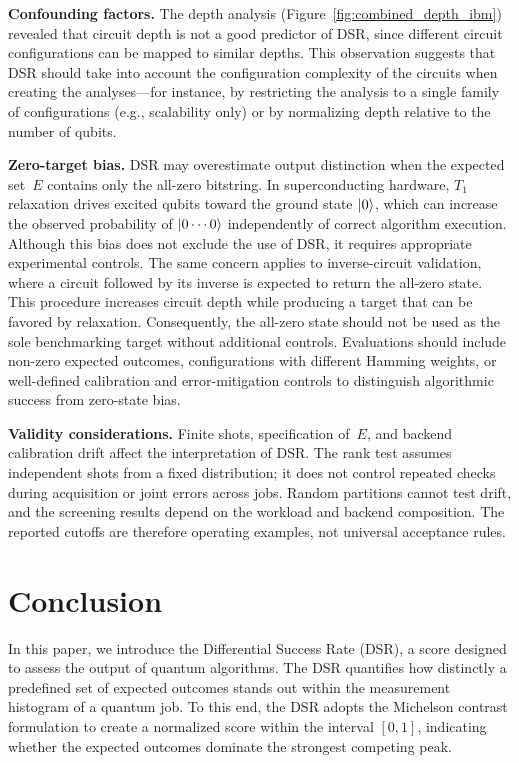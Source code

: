 \documentclass[pdflatex,sn-mathphys-num]{sn-jnl}
\theoremstyle{thmstyleone}%
\theoremstyle{thmstyletwo}%
\theoremstyle{thmstylethree}%
\begin{document}
\textbf{Confounding factors.} The depth analysis (Figure~\ref{fig:combined_depth_ibm}) revealed that circuit depth is not a good predictor of DSR, since different circuit configurations can be mapped to similar depths. This observation suggests that DSR should take into account the configuration complexity of the circuits when creating the analyses---for instance, by restricting the analysis to a single family of configurations (e.g., scalability only) or by normalizing depth relative to the number of qubits.

\textbf{Zero-target bias.} DSR may overestimate output distinction when the expected set~$E$ contains only the all-zero bitstring. In superconducting hardware, $T_1$ relaxation drives excited qubits toward the ground state $\ket{0}$, which can increase the observed probability of $\ket{0\cdots0}$ independently of correct algorithm execution. Although this bias does not exclude the use of DSR, it requires appropriate experimental controls. The same concern applies to inverse-circuit validation, where a circuit followed by its inverse is expected to return the all-zero state. This procedure increases circuit depth while producing a target that can be favored by relaxation. Consequently, the all-zero state should not be used as the sole benchmarking target without additional controls. Evaluations should include non-zero expected outcomes, configurations with different Hamming weights, or well-defined calibration and error-mitigation controls to distinguish algorithmic success from zero-state bias.

\textbf{Validity considerations.} Finite shots, specification of~$E$, and backend calibration drift affect the interpretation of DSR. The rank test assumes independent shots from a fixed distribution; it does not control repeated checks during acquisition or joint errors across jobs. Random partitions cannot test drift, and the screening results depend on the workload and backend composition. The reported cutoffs are therefore operating examples, not universal acceptance rules.

\FloatBarrier
\section{Conclusion}\label{sec:conclusion}

In this paper, we introduce the Differential Success Rate (DSR), a score designed to assess the output of quantum algorithms. The DSR quantifies how distinctly a predefined set of expected outcomes stands out within the measurement histogram of a quantum job. To this end, the DSR adopts the Michelson contrast formulation to create a normalized score within the interval $[0, 1]$, indicating whether the expected outcomes dominate the strongest competing peak.
\end{document}
